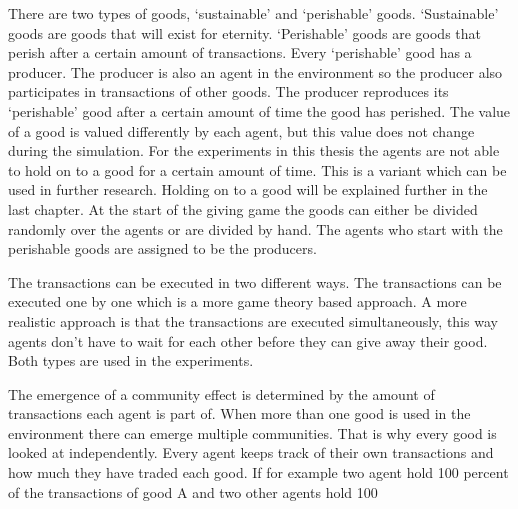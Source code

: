 \documentclass[twoside,openright]{uva-bachelor-thesis}
\begin{document}
There are two types of goods, ‘sustainable’ and ‘perishable’ goods. ‘Sustainable’ goods are goods that will exist for eternity. ‘Perishable’ goods are goods that perish after a certain amount of transactions. Every ‘perishable’ good has a producer. The producer is also an agent in the environment so the producer also participates in transactions of other goods. The producer reproduces its ‘perishable’ good after a certain amount of time the good has perished. The value of a good is valued differently by each agent, but this value does not change during the simulation. For the experiments in this thesis the agents are not able to hold on to a good for a certain amount of time. This is a variant which can be used in further research. Holding on to a good will be explained further in the last chapter. At the start of the giving game the goods can either be divided randomly over the agents or are divided by hand. The agents who start with the perishable goods are assigned to be the producers.

The transactions can be executed in two different ways. The transactions can be executed one by one which is a more game theory based approach. A more realistic approach is that the transactions are executed simultaneously, this way agents don’t have to wait for each other before they can give away their good. Both types are used in the experiments.

The emergence of a community effect is determined by the amount of transactions each agent is part of. When more than one good is used in the environment there can emerge multiple communities. That is why every good is looked at independently. Every agent keeps track of their own transactions and how much they have traded each good. If for example two agent hold 100 percent of the transactions of good A and two other agents hold 100%
\end{document}
